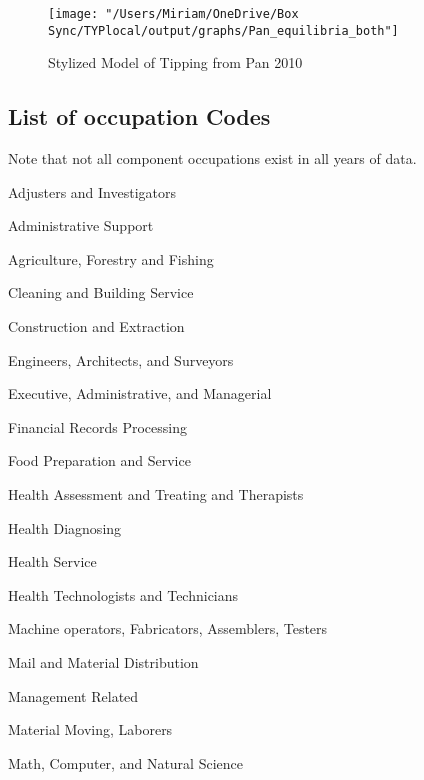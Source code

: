 \documentclass[11pt]{article}
\begin{document}
\begin{figure}[H]
\centering
\caption{Stylized Model of Tipping from Pan 2010}
\label{fig:tipping}
\texttt{[image: "/Users/Miriam/OneDrive/Box Sync/TYPlocal/output/graphs/Pan\_equilibria\_both"]}
\end{figure}


\subsection{List of occupation Codes} \label{occupations}

Note that not all component occupations exist in all years of data. 

%

   
   Adjusters and Investigators
   
   Administrative Support
   
   Agriculture, Forestry and Fishing
   
   Cleaning and Building Service 
   
   Construction and Extraction
   
   Engineers, Architects, and Surveyors
   
   Executive, Administrative, and Managerial
   
   Financial Records Processing 
   
   Food Preparation and Service 
   
   Health Assessment and Treating and Therapists
   
   Health Diagnosing
   
   Health Service
   
   Health Technologists and Technicians
   
   Machine operators, Fabricators, Assemblers, Testers
   
   Mail and Material Distribution
   
   Management Related
   
   Material Moving, Laborers
   
   Math, Computer, and Natural Science
   
\end{document}
